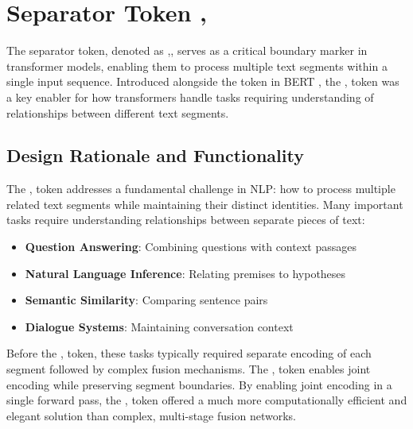 \section{Separator Token \sep{}}

The separator token, denoted as \sep{}, serves as a critical boundary marker in transformer models, enabling them to process multiple text segments within a single input sequence. Introduced alongside the \cls{} token in BERT \citep{devlin2018bert}, the \sep{} token was a key enabler for how transformers handle tasks requiring understanding of relationships between different text segments.

\subsection{Design Rationale and Functionality}

The \sep{} token addresses a fundamental challenge in NLP: how to process multiple related text segments while maintaining their distinct identities. Many important tasks require understanding relationships between separate pieces of text:

\begin{itemize}
\item \textbf{Question Answering}: Combining questions with context passages
\item \textbf{Natural Language Inference}: Relating premises to hypotheses  
\item \textbf{Semantic Similarity}: Comparing sentence pairs
\item \textbf{Dialogue Systems}: Maintaining conversation context
\end{itemize}

Before the \sep{} token, these tasks typically required separate encoding of each segment followed by complex fusion mechanisms. The \sep{} token enables joint encoding while preserving segment boundaries. By enabling joint encoding in a single forward pass, the \sep{} token offered a much more computationally efficient and elegant solution than complex, multi-stage fusion networks.


